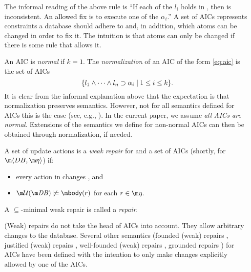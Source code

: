 The informal reading of the above rule is ``If each of the $l_i$ holds in \db, then \db is inconsistent. An allowed fix is to execute one of the $\alpha_i$.''
A set of AICs represents constraints a database should adhere to and, in addition, which atoms can be changed in order to fix it. The intuition is that atoms can only be changed if there is some rule that allows it. 


An AIC is \emph{normal} if $k=1$. The \emph{normalization} of an AIC of the form \eqref{eq:aic} is the set of AICs 
\[\{l_1\land \dots\land l_n\supset \alpha_i\mid 1\leq i\leq k\}.\]
It is clear from the informal explanation above that the expectation is that normalization preserves semantics. However, not for all semantics defined for AICs this is the case (see, e.g., \cite{}). In the current paper, we assume \emph{all AICs are normal}. Extensions of the semantics we define for non-normal AICs can then be obtained through normalization, if needed. 

\begin{definition}
 A set of update actions \UU is a \emph{weak repair} for \db and a set \aics of AICs (shortly, for $\fulldb$) if:
 \begin{itemize}
  \item every action in \UU changes \db, and 
  \item $\UU(\db)\not\models \body(r)$ for each $r\in\aics$.
 \end{itemize}
A $\subseteq$-minimal weak repair is called a \emph{repair}.
\end{definition}

(Weak) repairs do not take the head of AICs into account. They allow arbitrary changes to the database. Several other semantics (founded (weak) repairs \cite{}, justified (weak) repairs \cite{}, well-founded (weak) repairs \cite{}, grounded repairs \cite{}) for AICs have been defined with the intention to only make changes explicitly allowed by one of the AICs. 

%  


